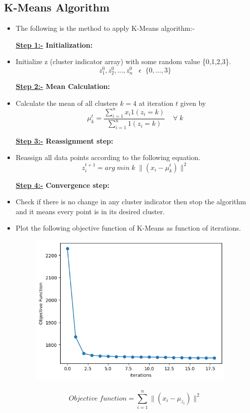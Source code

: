 \documentclass[12pt, a4paper]{article}
\begin{document}
\subsection{K-Means Algorithm}
\begin{itemize}
    \item \large The following is the method to apply K-Means algorithm:-
    
    \large \textbf{\underline{Step 1:-} Initialization:}
    \item  \large Initialize z (cluster indicator array) with some random value \{0,1,2,3\}.
    \[z_1^0,z_2^0,\dots,z_n^0 \; \; \; \epsilon \; \; \{0,\dots,3\}\]

    \large \textbf{\underline{Step 2:-} Mean Calculation:}
    \item \large Calculate the mean of all clusters $k=4$ at iteration $t$ given by
    \[\mu_k^t=\frac{\sum\limits_{i=1}^{n}x_i 1(z_i=k)}{\sum\limits_{i=1}^{n}1(z_i=k)}\;\;\;\;\forall\;k\]

    \large \textbf{\underline{Step 3:-} Reassignment step:}
    \item \large Reassign all data points according to the following equation.
    \[z_i^{t+1}=arg\;min\; k\;\|(x_i-\mu_k^t)\|^2 \]

    \large \textbf{\underline{Step 4:-} Convergence step:}
    \item \large Check if there is no change in any cluster indicator then stop the algorithm and it means every point is in its desired cluster.
    
    \item \large Plot the following objective function of K-Means as function of iterations.
    \begin{figure}[ht]
        \centering
        \includegraphics[width=0.95\textwidth]{K-Means}
        \caption{}
        \label{fig:mesh3}
    \end{figure}
    \[Objective\;function=\sum\limits_{i=1}^{n}\|(x_i-\mu_{z_i})\|^2\]
\end{itemize}
\end{document}
